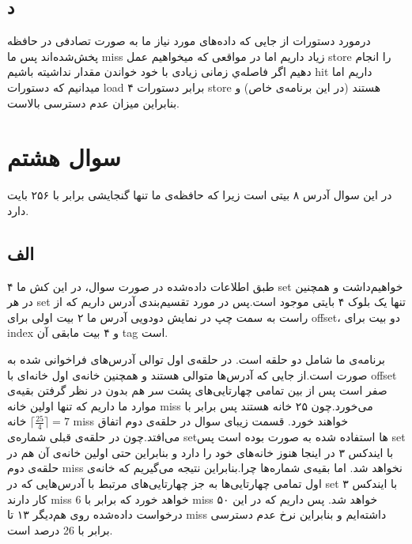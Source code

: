 \documentclass[11pt]{article}
\begin{document}
\subsection{د}
درمورد دستورات از جایی که داده‌های مورد نیاز ما به صورت تصادفی در حافظه پخش‌شده‌اند پس ما miss زیاد داریم اما در مواقعی که میخواهیم عمل store را انجام دهیم اگر فاصله‌ي زمانی زیادی با خود خواندن مقدار نداشیته باشیم hit داریم اما میدانیم که دستورات load ۴ برابر دستورات store هستند (در این برنامه‌ی خاص) و بنابراین میزان عدم دسترسی بالاست.
\section{سوال هشتم}
در این سوال آدرس ۸ بیتی است زیرا که حافظه‌ی ما تنها گنجایشی برابر با ۲۵۶ بایت دارد.
\subsection{الف}
طبق اطلاعات داده‌شده در صورت سوال،‌ در این کش ما ۴ set خواهیم‌داشت و همچنین در هر set تنها یک بلوک ۴ بایتی موجود است.پس در مورد تقسیم‌بندی آدرس داریم که از راست به سمت چپ در نمایش دودویی آدرس ما ۲ بیت اولی برای offset، دو بیت برای index و ۴ بیت مابقی آن tag است.

برنامه‌ی ما شامل دو حلقه است. در حلقه‌ی اول توالی آدرس‌های فراخوانی شده به صورت
\newline
{}
است.از جایی که آدرس‌ها متوالی هستند و همچنین خانه‌ی اول خانه‌ای با offset صفر است پس از بین تمامی چهارتایی‌های پشت‌ سر هم بدون در نظر گرفتن بقیه‌ی موارد ما داریم که تنها اولین خانه miss می‌خورد.چون ۲۵ خانه هستند پس برابر با 
$\lceil \frac{25}{4} \rceil = 7$
خانه miss خواهند خورد.\newline
قسمت زیبای سوال در حلقه‌ی دوم اتفاق می‌افتد.چون در حلقه‌ی قبلی شماره‌ی setها استفاده شده به صورت
بوده است پس set با ایندکس ۳ در اینجا هنوز خانه‌های خود را دارد و بنابراین حتی اولین خانه‌ی آن هم  در حلقه‌ی دوم miss نخواهد شد. اما بقیه‌ی شماره‌ها چرا.بنابراین نتیجه می‌گیریم که خانه‌ی اول تمامی چهارتایی‌ها به جز چهارتایی‌های مرتبط با آدرس‌هایی که در set با ایندکس ۳ کار دارند miss خواهد خورد که برابر با 6 miss خواهد شد.
پس داریم که در این ۵۰ درخواست داده‌شده روی هم‌دیگر ۱۳ تا miss داشته‌ایم و بنابراین نرخ عدم دسترسی برابر با 26 درصد است.
\end{document}
